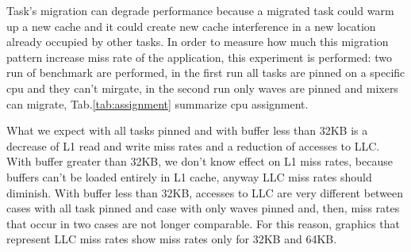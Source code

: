 Task's migration can degrade performance because a migrated task could warm up a new cache and it could create new cache interference in a new location 
already occupied by other tasks. In order to measure how much this migration pattern increase miss rate of the application, this experiment is performed: 
two run of benchmark are performed, in the first run all tasks are pinned on a specific cpu and they can't mirgate, in the second run only waves are pinned
and mixers can migrate, Tab.\ref{tab:assignment} summarize cpu assignment. 

\begin{table}[tbp]
\centering%
\hspace{4em}
\label{tab:assignment}
\caption{cpu assignment performed}
\end{table}

What we expect with all tasks pinned and with buffer less than 32KB is a decrease of L1 read and write miss rates and a reduction of accesses to LLC. With 
buffer greater than 32KB, we don't know effect on L1 miss rates, because buffers can't be loaded entirely in L1 cache, anyway LLC miss rates should 
diminish. With buffer less than 32KB, accesses to LLC are very different between cases with all task pinned and case with only waves pinned and, then, miss 
rates that occur in two cases are not longer comparable. For this reason, graphics that represent LLC miss rates show miss rates only for 32KB and 64KB.

